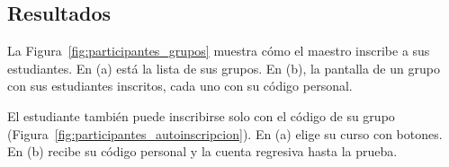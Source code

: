 \subsection{Resultados}

La Figura~\ref{fig:participantes_grupos} muestra cómo el maestro inscribe a sus estudiantes. En (a) está la lista de sus grupos. En (b), la pantalla de un grupo con sus estudiantes inscritos, cada uno con su código personal.


El estudiante también puede inscribirse solo con el código de su grupo (Figura~\ref{fig:participantes_autoinscripcion}). En (a) elige su curso con botones. En (b) recibe su código personal y la cuenta regresiva hasta la prueba.

